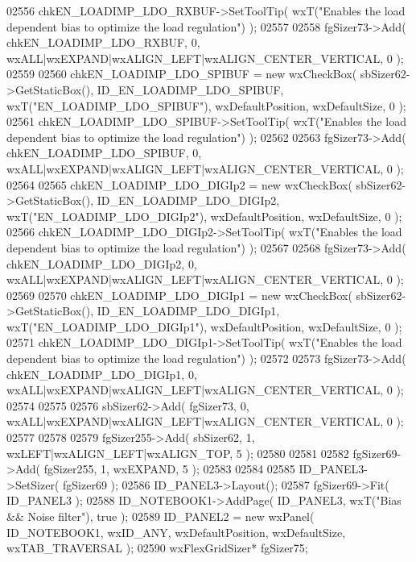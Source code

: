 \begin{DoxyCode}
02556     chkEN_LOADIMP_LDO_RXBUF->SetToolTip( wxT(\textcolor{stringliteral}{"Enables the load dependent bias to optimize the load
       regulation"}) );
02557     
02558     fgSizer73->Add( chkEN_LOADIMP_LDO_RXBUF, 0, wxALL|wxEXPAND|wxALIGN\_LEFT|wxALIGN\_CENTER\_VERTICAL, 0 );
02559     
02560     chkEN_LOADIMP_LDO_SPIBUF = \textcolor{keyword}{new} wxCheckBox( sbSizer62->GetStaticBox(), 
      ID_EN_LOADIMP_LDO_SPIBUF, wxT(\textcolor{stringliteral}{"EN\_LOADIMP\_LDO\_SPIBUF"}), wxDefaultPosition, wxDefaultSize, 0 );
02561     chkEN_LOADIMP_LDO_SPIBUF->SetToolTip( wxT(\textcolor{stringliteral}{"Enables the load dependent bias to optimize the load
       regulation"}) );
02562     
02563     fgSizer73->Add( chkEN_LOADIMP_LDO_SPIBUF, 0, wxALL|wxEXPAND|wxALIGN\_LEFT|wxALIGN\_CENTER\_VERTICAL, 0 );
02564     
02565     chkEN_LOADIMP_LDO_DIGIp2 = \textcolor{keyword}{new} wxCheckBox( sbSizer62->GetStaticBox(), 
      ID_EN_LOADIMP_LDO_DIGIp2, wxT(\textcolor{stringliteral}{"EN\_LOADIMP\_LDO\_DIGIp2"}), wxDefaultPosition, wxDefaultSize, 0 );
02566     chkEN_LOADIMP_LDO_DIGIp2->SetToolTip( wxT(\textcolor{stringliteral}{"Enables the load dependent bias to optimize the load
       regulation"}) );
02567     
02568     fgSizer73->Add( chkEN_LOADIMP_LDO_DIGIp2, 0, wxALL|wxEXPAND|wxALIGN\_LEFT|wxALIGN\_CENTER\_VERTICAL, 0 );
02569     
02570     chkEN_LOADIMP_LDO_DIGIp1 = \textcolor{keyword}{new} wxCheckBox( sbSizer62->GetStaticBox(), 
      ID_EN_LOADIMP_LDO_DIGIp1, wxT(\textcolor{stringliteral}{"EN\_LOADIMP\_LDO\_DIGIp1"}), wxDefaultPosition, wxDefaultSize, 0 );
02571     chkEN_LOADIMP_LDO_DIGIp1->SetToolTip( wxT(\textcolor{stringliteral}{"Enables the load dependent bias to optimize the load
       regulation"}) );
02572     
02573     fgSizer73->Add( chkEN_LOADIMP_LDO_DIGIp1, 0, wxALL|wxEXPAND|wxALIGN\_LEFT|wxALIGN\_CENTER\_VERTICAL, 0 );
02574     
02575     
02576     sbSizer62->Add( fgSizer73, 0, wxALL|wxEXPAND|wxALIGN\_LEFT|wxALIGN\_CENTER\_VERTICAL, 0 );
02577     
02578     
02579     fgSizer255->Add( sbSizer62, 1, wxLEFT|wxALIGN\_LEFT|wxALIGN\_TOP, 5 );
02580     
02581     
02582     fgSizer69->Add( fgSizer255, 1, wxEXPAND, 5 );
02583     
02584     
02585     ID_PANEL3->SetSizer( fgSizer69 );
02586     ID_PANEL3->Layout();
02587     fgSizer69->Fit( ID_PANEL3 );
02588     ID_NOTEBOOK1->AddPage( ID_PANEL3, wxT(\textcolor{stringliteral}{"Bias && Noise filter"}), \textcolor{keyword}{true} );
02589     ID_PANEL2 = \textcolor{keyword}{new} wxPanel( ID_NOTEBOOK1, wxID\_ANY, wxDefaultPosition, wxDefaultSize, wxTAB\_TRAVERSAL );
02590     wxFlexGridSizer* fgSizer75;

\end{DoxyCode}
